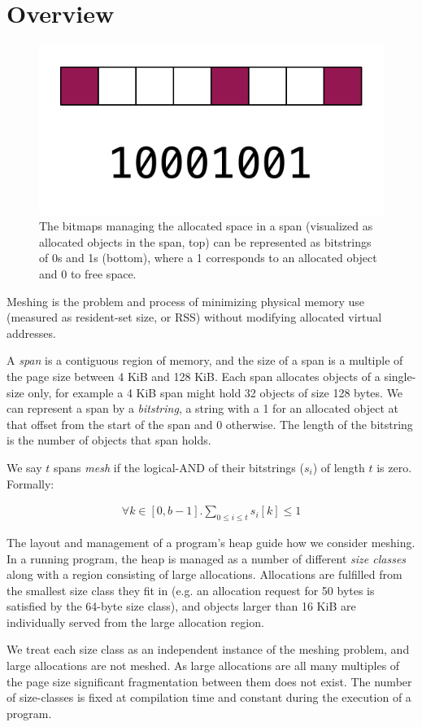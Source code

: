 \section{Overview}
\label{sec:meshing}

\begin{figure}[!t]
\centering
\includegraphics[width=.3\textwidth]{figures/bitmap_bitstring}
\caption{The bitmaps managing the allocated space in a span
  (visualized as allocated objects in the span, top) can be
  represented as bitstrings of 0s and 1s (bottom), where a 1
  corresponds to an allocated object and 0 to free space.}
\label{fig:bitmap-bitstring}
\end{figure}

Meshing is the problem and process of minimizing physical memory use
(measured as resident-set size, or RSS) without modifying allocated
virtual addresses.

A \textit{span} is a contiguous region of memory, and the size of a
span is a multiple of the page size between 4 KiB and 128 KiB.  Each
span allocates objects of a single-size only, for example a 4 KiB span
might hold 32 objects of size 128 bytes.  We can represent a span by a
\textit{bitstring}, a string with a 1 for an allocated object at that
offset from the start of the span and 0 otherwise.  The length of the
bitstring is the number of objects that span holds.

We say $t$ spans \textit{mesh} if the logical-AND of their bitstrings
($s_i$) of length $t$ is zero.  Formally:

\begin{align}
  \forall k \in [0, b-1]. \sum_{0 \leq i \leq t} s_i[k] \leq 1
\end{align}

The layout and management of a program's heap guide how we consider
meshing.  In a running program, the heap is managed as a number of
different \textit{size classes} along with a region consisting of
large allocations.  Allocations are fulfilled from the smallest size
class they fit in (e.g. an allocation request for 50 bytes is
satisfied by the 64-byte size class), and objects larger than 16 KiB
are individually served from the large allocation region.

We treat each size class as an independent instance of the meshing
problem, and large allocations are not meshed.  As large allocations
are all many multiples of the page size significant fragmentation
between them does not exist.  The number of size-classes is fixed at
compilation time and constant during the execution of a program.

